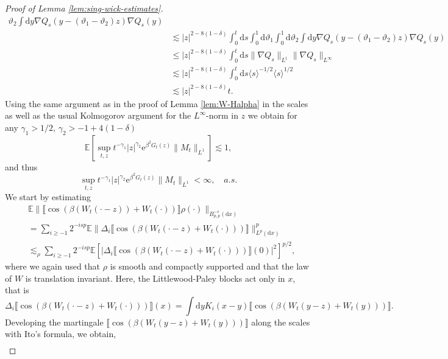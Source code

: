 \documentclass[11pt, a4paper]{scrartcl}
\numberwithin{equation}{section}
\theoremstyle{plain}
\theoremstyle{remark}
\newcommand{\mathd}{\mathrm{d}}
\newcommand{\mathe}{\mathrm{e}}
\newcommand{\tmtextbf}[1]{\text{{\bfseries{#1}}}}
\begin{document}
\begin{proof}[Proof of Lemma \ref{lem:sing-wick-estimates}]
\[\begin{aligned}
       \vartheta_2 \int \mathd y \nabla Q_s (y - (\vartheta_1 - \vartheta_2)
       z) \nabla Q_s (y)\\
       &\lesssim  | z |^{2 - 8 (1 - \delta)} \int_0^t \mathd s \int_0^1
       \mathd \vartheta_1 \int_0^1 \mathd \vartheta_2 \int \mathd y \nabla Q_s
       (y - (\vartheta_1 - \vartheta_2) z) \nabla Q_s (y)\\
       &\leqslant  | z |^{2 - 8 (1 - \delta)}  \int_0^t \mathd s \| \nabla
       Q_s \|_{L^1} \| \nabla Q_s \|_{L^{\infty}}\\
       &\lesssim  | z |^{2 - 8 (1 - \delta)}  \int_0^t \mathd s \langle s
       \rangle^{- 1 / 2} \langle s \rangle^{1 / 2}\\
       &\lesssim  | z |^{2 - 8 (1 - \delta)} t.
     \end{aligned} \]
  Using the same argument as in the proof of Lemma \ref{lem:W-Halpha} in the
  scales as well as the usual Kolmogorov argument for the $L^{\infty}$-norm in
  $z$ we obtain for any $\gamma_1 > 1 / 2$, $\gamma_2 > - 1 + 4 (1 - \delta)$
  \[ \mathbb{E} [\sup_{t, z} t^{- \gamma_1} | z |^{\gamma_2} \mathe^{\beta^2
     G_t (z)} \| M_t \|_{L^1} ] \lesssim 1, \]
  and thus
  \[ \sup_{t, z} t^{- \gamma_1} | z |^{\gamma_2} \mathe^{\beta^2 G_t (z)} \|
     M_t \|_{L^1}  < \infty, \quad a.s. \]
  \tmtextbf{(C)} We start by estimating
  \[ \begin{aligned}
       & \mathbb{E} \| \llbracket \cos (\beta (W_t (\cdot - z)) + W_t
       (\cdot)) \rrbracket \rho (\cdot) \|_{B^{- s}_{p, p} (\mathd x)}\\
       &= \sum_{i \geqslant - 1} 2^{- isp} \mathbb{E} \| \Delta_i
       \llbracket \cos (\beta (W_t (\cdot - z) + W_t (\cdot))) \rrbracket
       \|^p_{L^p (\mathd x)}\\
       &\lesssim_{\rho}  \sum_{i \geqslant - 1} 2^{- isp} \mathbb{E} [|
       \Delta_i \llbracket \cos (\beta (W_t (\cdot - z) + W_t (\cdot)))
       \rrbracket (0) |^2]^{p / 2},
     \end{aligned} \]
  where we again used that $\rho$ is smooth and compactly supported and that
  the law of $W$ is translation invariant. Here, the Littlewood-Paley blocks
  act only in $x$, that is
  \[ \Delta_i \llbracket \cos (\beta (W_t (\cdot - z) + W_t (\cdot)))
     \rrbracket (x) = \int \mathd y K_i (x - y) \llbracket \cos (\beta (W_t (y
     - z) + W_t (y))) \rrbracket . \]
  Developing the martingale $\llbracket \cos (\beta (W_t (y - z) + W_t (y)))
  \rrbracket$ along the scales with Ito's formula, we obtain,
  \[ \begin{aligned}

\end{aligned}\]
\end{proof}
\end{document}

